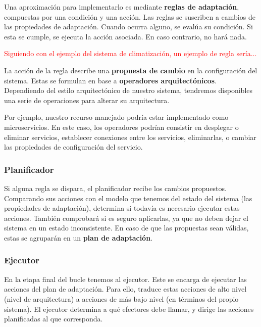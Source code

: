 Una aproximación para implementarlo es mediante \textbf{reglas de adaptación}, compuestas por una condición y una acción. Las reglas se suscriben a cambios de las propiedades de adaptación. Cuando ocurra alguno, se evalúa su condición. Si esta se cumple, se ejecuta la acción asociada. En caso contrario, no hará nada.

\textcolor{red}{Siguiendo con el ejemplo del sistema de climatización, un ejemplo de regla sería...}

La acción de la regla describe una \textbf{propuesta de cambio} en la configuración del sistema. Estas se formulan en base a \textbf{operadores arquitectónicos}. \cite{garlanIncreasingSystemDependability2003} Dependiendo del estilo arquitectónico de nuestro sistema, tendremos disponibles una serie de operaciones para alterar su arquitectura.

Por ejemplo, nuestro recurso manejado podría estar implementado como microservicios. En este caso, los operadores podrían consistir en desplegar o eliminar servicios, establecer conexiones entre los servicios, eliminarlas, o cambiar las propiedades de configuración del servicio. \cite{fonsServiciosAdaptivereadyPara2021}

\subsubsection{Planificador}

Si alguna regla se dispara, el planificador recibe los cambios propuestos. Comparando sus acciones con el modelo que tenemos del estado del sistema (las propiedades de adaptación), determina si todavía es necesario ejecutar estas acciones. También comprobará si es seguro aplicarlas, ya que no deben dejar el sistema en un estado inconsistente. En caso de que las propuestas sean válidas, estas se agruparán en un \textbf{plan de adaptación}.

\subsubsection{Ejecutor}

En la etapa final del bucle tenemos al ejecutor. Este se encarga de ejecutar las acciones del plan de adaptación. Para ello, traduce estas acciones de alto nivel (nivel de arquitectura) a acciones de más bajo nivel (en términos del propio sistema). \cite{garlanIncreasingSystemDependability2003} El ejecutor determina a qué efectores debe llamar, y dirige las acciones planificadas al que corresponda.

